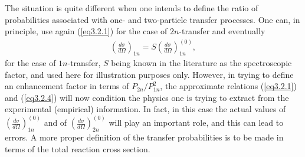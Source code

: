 The situation is  quite different when one intends to define the ratio of probabilities associated with one- and two-particle transfer processes. One can, in principle, use again  (\ref{eq3.2.1}) for the case of $2n$-transfer and eventually
\begin{align}\label{eq3.2.4}
\left(\frac{d\sigma}{d\Omega}\right)_{1n}=S\left(\frac{d\sigma}{d\Omega}\right)_{1n}^{(0)},
\end{align}
for the case of $1n$-transfer, $S$ being known in the literature as the spectroscopic factor, and used here for illustration purposes only. However, in trying to define an enhancement factor in terms of $P_{2n}/P_{1n}^2$, the approximate relations (\ref{eq3.2.1}) and (\ref{eq3.2.4}) will now condition the physics one is trying to extract from the experimental (empirical) information. In fact, in this case the actual values of $\left(\frac{d\sigma}{d\Omega}\right)_{1n}^{(0)}$ and of $\left(\frac{d\sigma}{d\Omega}\right)_{2n}^{(0)}$ will play an important role, and this can lead to errors. A more proper definition of the transfer probabilities is to be made in terms of the total reaction cross section.


